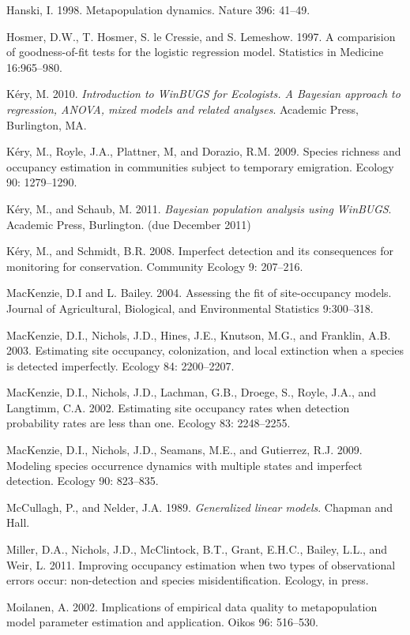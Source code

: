 \documentclass[12pt]{article}
\begin{document}
\rf Hanski, I. 1998. Metapopulation dynamics. Nature 396: 41--49.

\rf Hosmer, D.W., T. Hosmer, S. le Cressie, and S. Lemeshow. 1997. A
comparision of goodness-of-fit tests for the logistic
regression model. Statistics in Medicine 16:965--980.

\rf K\'{e}ry, M. 2010. \emph{Introduction to WinBUGS for
  Ecologists. A Bayesian approach to regression, ANOVA, mixed
  models and related analyses}. Academic Press, Burlington, MA.

\rf K\'{e}ry, M., Royle, J.A., Plattner, M, and Dorazio,
R.M. 2009. Species richness and occupancy estimation in communities
subject to temporary emigration. Ecology 90: 1279--1290.

\rf K\'{e}ry, M., and Schaub, M. 2011. \emph{Bayesian population
  analysis using WinBUGS}. Academic Press, Burlington. (due December
2011)

\rf K\'{e}ry, M., and Schmidt, B.R. 2008. Imperfect detection and its
consequences for monitoring for conservation. Community Ecology 9:
207--216.

\rf MacKenzie, D.I and L. Bailey. 2004. Assessing the fit of
site-occupancy models. Journal of Agricultural, Biological, and
Environmental Statistics 9:300--318.

\rf MacKenzie, D.I., Nichols, J.D., Hines, J.E., Knutson, M.G., and
Franklin, A.B. 2003. Estimating site occupancy, colonization, and
local extinction when a species is detected imperfectly. Ecology 84:
2200--2207.

\rf MacKenzie, D.I., Nichols, J.D., Lachman, G.B., Droege, S., Royle,
J.A., and Langtimm, C.A. 2002. Estimating site occupancy rates when
detection probability rates are less than one. Ecology 83:
2248--2255.

\rf MacKenzie, D.I., Nichols, J.D., Seamans, M.E., and Gutierrez,
R.J. 2009. Modeling species occurrence dynamics with multiple states
and imperfect detection. Ecology 90: 823--835.

\rf McCullagh, P., and Nelder, J.A. 1989. \emph{Generalized linear
  models}. Chapman and Hall.

\rf Miller, D.A., Nichols, J.D., McClintock, B.T., Grant, E.H.C.,
Bailey, L.L., and Weir, L. 2011. Improving occupancy estimation when
two types of observational errors occur: non-detection and species
misidentification. Ecology, in press.

\rf Moilanen, A. 2002. Implications of empirical data quality to
metapopulation model parameter estimation and application. Oikos 96:
516--530.
\end{document}
